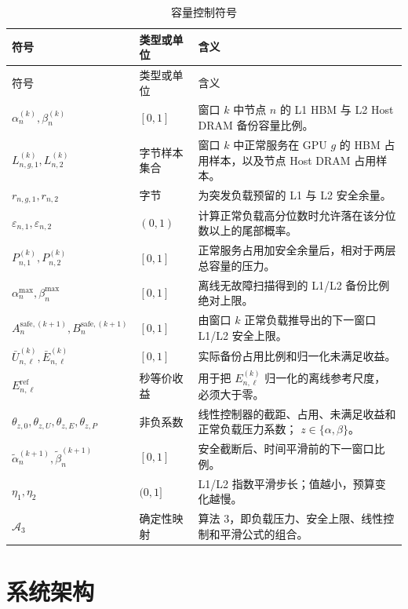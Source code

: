\documentclass[UTF8,11pt,a4paper,fontset=fandol]{ctexart}
\begin{document}
\begin{longtable}{p{}p{}p{}}
  \caption{容量控制符号}\label{tab:algorithm3-symbols}\\
  \toprule
  符号 & 类型或单位 & 含义 \\
  \midrule
  \endfirsthead
  \toprule
  符号 & 类型或单位 & 含义 \\
  \midrule
  \endhead
  $\alpha_n^{(k)},\beta_n^{(k)}$ & $[0,1]$
    & 窗口 $k$ 中节点 $n$ 的 L1 HBM 与 L2 Host DRAM 备份容量比例。 \\
  $L_{n,g,1}^{(k)},L_{n,2}^{(k)}$ & 字节样本集合
    & 窗口 $k$ 中正常服务在 GPU $g$ 的 HBM 占用样本，以及节点 Host DRAM
      占用样本。 \\
  $r_{n,g,1},r_{n,2}$ & 字节
    & 为突发负载预留的 L1 与 L2 安全余量。 \\
  $\varepsilon_{n,1},\varepsilon_{n,2}$ & $(0,1)$
    & 计算正常负载高分位数时允许落在该分位数以上的尾部概率。 \\
  $P_{n,1}^{(k)},P_{n,2}^{(k)}$ & $[0,1]$
    & 正常服务占用加安全余量后，相对于两层总容量的压力。 \\
  $\alpha_n^{\max},\beta_n^{\max}$ & $[0,1]$
    & 离线无故障扫描得到的 L1/L2 备份比例绝对上限。 \\
  $A_n^{\mathrm{safe},(k+1)},B_n^{\mathrm{safe},(k+1)}$ & $[0,1]$
    & 由窗口 $k$ 正常负载推导出的下一窗口 L1/L2 安全上限。 \\
  $\bar U_{n,\ell}^{(k)},\bar E_{n,\ell}^{(k)}$ & $[0,1]$
    & 实际备份占用比例和归一化未满足收益。 \\
  $E_{n,\ell}^{\mathrm{ref}}$ & 秒等价收益
    & 用于把 $E_{n,\ell}^{(k)}$ 归一化的离线参考尺度，必须大于零。 \\
  $\theta_{z,0},\theta_{z,U},\theta_{z,E},\theta_{z,P}$ & 非负系数
    & 线性控制器的截距、占用、未满足收益和正常负载压力系数；
      $z\in\{\alpha,\beta\}$。 \\
  $\widetilde\alpha_n^{(k+1)},\widetilde\beta_n^{(k+1)}$ & $[0,1]$
    & 安全截断后、时间平滑前的下一窗口比例。 \\
  $\eta_1,\eta_2$ & $(0,1]$
    & L1/L2 指数平滑步长；值越小，预算变化越慢。 \\
  $\mathcal A_3$ & 确定性映射
    & 算法 3，即负载压力、安全上限、线性控制和平滑公式的组合。 \\
  \bottomrule
\end{longtable}

\section{系统架构}
\end{document}
